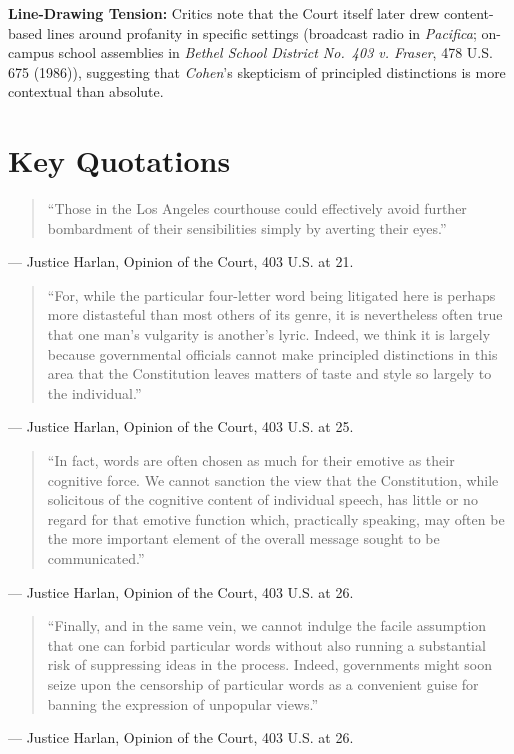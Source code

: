 \documentclass[12pt]{article}
\begin{document}
\textbf{Line-Drawing Tension:} Critics note that the Court itself later drew content-based lines around profanity in specific settings (broadcast radio in \textit{Pacifica}; on-campus school assemblies in \textit{Bethel School District No.\ 403 v. Fraser}, 478 U.S. 675 (1986)), suggesting that \textit{Cohen}'s skepticism of principled distinctions is more contextual than absolute.

\section{Key Quotations}
\begin{quote}
``Those in the Los Angeles courthouse could effectively avoid further bombardment of their sensibilities simply by averting their eyes.''
\end{quote}
\noindent --- Justice Harlan, Opinion of the Court, 403 U.S. at 21.

\begin{quote}
``For, while the particular four-letter word being litigated here is perhaps more distasteful than most others of its genre, it is nevertheless often true that one man's vulgarity is another's lyric. Indeed, we think it is largely because governmental officials cannot make principled distinctions in this area that the Constitution leaves matters of taste and style so largely to the individual.''
\end{quote}
\noindent --- Justice Harlan, Opinion of the Court, 403 U.S. at 25.

\begin{quote}
``In fact, words are often chosen as much for their emotive as their cognitive force. We cannot sanction the view that the Constitution, while solicitous of the cognitive content of individual speech, has little or no regard for that emotive function which, practically speaking, may often be the more important element of the overall message sought to be communicated.''
\end{quote}
\noindent --- Justice Harlan, Opinion of the Court, 403 U.S. at 26.

\begin{quote}
``Finally, and in the same vein, we cannot indulge the facile assumption that one can forbid particular words without also running a substantial risk of suppressing ideas in the process. Indeed, governments might soon seize upon the censorship of particular words as a convenient guise for banning the expression of unpopular views.''
\end{quote}
\noindent --- Justice Harlan, Opinion of the Court, 403 U.S. at 26.
\end{document}
